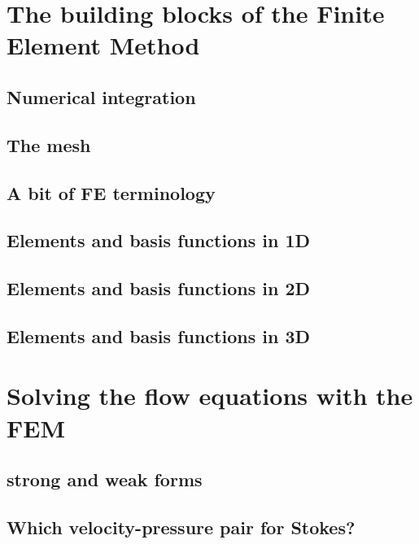 \documentclass[a4paper]{article}
\begin{document}
\section{The building blocks of the Finite Element Method} %
\subsection{Numerical integration}  %
\subsection{The mesh}
\subsection{A bit of FE terminology}  %
\subsection{Elements and basis functions in 1D}  %
\subsection{Elements and basis functions in 2D}  %
\subsection{Elements and basis functions in 3D}  %

\newpage 
\section{Solving the flow equations with the FEM} %
\subsection{strong and weak forms}  %
\subsection{Which velocity-pressure pair for Stokes?}  %
\end{document}
